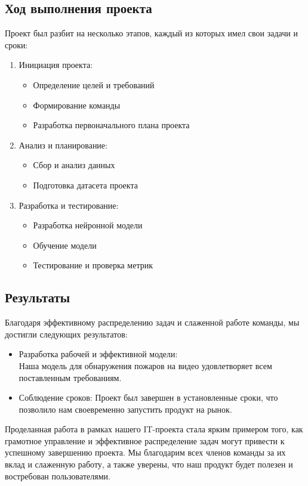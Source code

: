     \subsection{Ход выполнения проекта}
    Проект был разбит на несколько этапов, каждый из которых имел свои задачи и сроки:
    \begin{enumerate}
        \item Инициация проекта:
            \begin{itemize}
                \item Определение целей и требований
                \item Формирование команды
                \item Разработка первоначального плана проекта
            \end{itemize}
        \item Анализ и планирование:
            \begin{itemize}
                \item Сбор и анализ данных
                \item Подготовка датасета проекта
            \end{itemize}
        \item Разработка и тестирование:
            \begin{itemize}
                \item Разработка нейронной модели
                \item Обучение модели
                \item Тестирование и проверка метрик
            \end{itemize}
    \end{enumerate}

    \subsection{Результаты}
    Благодаря эффективному распределению задач и слаженной работе команды, мы достигли следующих результатов:
    \begin{itemize}
        \item Разработка рабочей и эффективной модели: \\
            Наша модель для обнаружения пожаров на видео удовлетворяет всем поставленным требованиям.
        \item Соблюдение сроков: Проект был завершен в установленные сроки, что позволило нам своевременно запустить продукт на рынок.
    \end{itemize}

    Проделанная работа в рамках нашего IT-проекта стала ярким примером того, как грамотное управление и эффективное распределение задач могут привести к успешному завершению проекта. Мы благодарим всех членов команды за их вклад и слаженную работу, а также уверены, что наш продукт будет полезен и востребован пользователями.
    
\endinput
